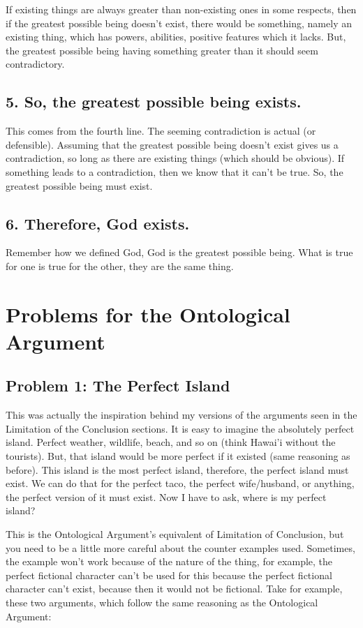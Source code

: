 If existing things are always greater than non-existing ones in some respects, then if the greatest possible being doesn't exist, there would be something, namely an existing thing, which has powers, abilities, positive features which it lacks. But, the greatest possible being having something greater than it should seem contradictory. 

\subsection{5. So, the greatest possible being exists.}

This comes from the fourth line. The seeming contradiction is actual (or defensible). Assuming that the greatest possible being doesn't exist gives us a contradiction, so long as there are existing things (which should be obvious). If something leads to a contradiction, then we know that it can't be true. So, the greatest possible being must exist. 

\subsection{6. Therefore, God exists.}

Remember how we defined God, God is the greatest possible being. What is true for one is true for the other, they are the same thing.

\section{Problems for the Ontological Argument}
\subsection{Problem 1: The Perfect Island}

This was actually the inspiration behind my versions of the arguments seen in the Limitation of the Conclusion sections. It is easy to imagine the absolutely perfect island. Perfect weather, wildlife, beach, and so on (think Hawai’i without the tourists). But, that island would be more perfect if it existed (same reasoning as before). This island is the most perfect island, therefore, the perfect island must exist. We can do that for the perfect taco, the perfect wife/husband, or anything, the perfect version of it must exist. Now I have to ask, where is my perfect island?

This is the Ontological Argument's equivalent of Limitation of Conclusion, but you need to be a little more careful about the counter examples used.  Sometimes, the example won't work because of the nature of the thing, for example, the perfect fictional character can't be used for this because the perfect fictional character can't exist, because then it would not be fictional. Take for example, these two arguments, which follow the same reasoning as the Ontological Argument:


